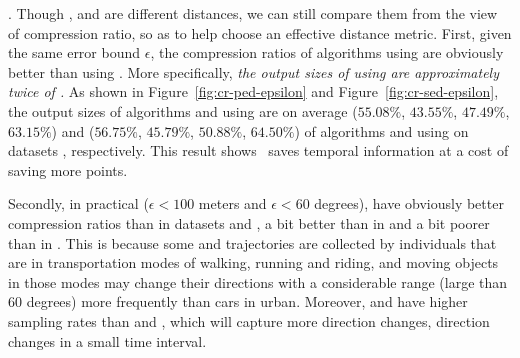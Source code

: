 .
Though \ped, \sed and \dad are different distances, we can still compare them from the view of compression ratio, so as to help choose an effective distance metric.
%
First, given the same error bound $\epsilon$, the compression ratios of algorithms using \ped are obviously better
than using \sed. More specifically, \emph{the output sizes of using \sed are approximately twice of \ped.}
%
As shown in Figure~\ref{fig:cr-ped-epsilon} and Figure~\ref{fig:cr-sed-epsilon}, the output sizes of algorithms \tpa and \dpa
using \ped are on average ($55.08\%$, $43.55\%$, $47.49\%$, $63.15\%$) and ($56.75\%$, $45.79\%$,
$50.88\%$, $64.50\%$) of algorithms \tpa and \dpa using \sed on datasets \dSets, respectively.
%
%
This result shows ~\sed saves temporal information at a cost of saving more points.


Secondly, in practical (\eg $\epsilon <100$ meters and $\epsilon < 60$ degrees), \sed have obviously better compression ratios than \dad in datasets \geolife and \mopsi, a bit better than \dad in \taxi and a bit poorer than \dad in \ucar.
This is because some \geolife and \mopsi trajectories are collected by individuals that are in transportation modes of walking, running and riding, and moving objects in those modes may change their directions with a considerable range (\eg large than $60$ degrees) more frequently than cars in urban. Moreover, \geolife and \mopsi have higher sampling rates than \taxi and \ucar, which will capture more direction changes, \ie direction changes in a small time interval.







